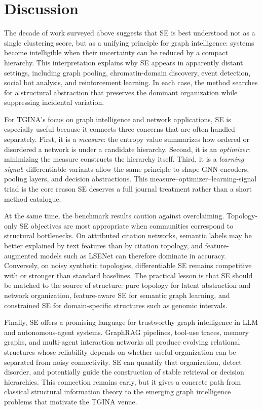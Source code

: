\section{Discussion}
\label{sec:discussion}

The decade of work surveyed above suggests that SE is best understood not as a
single clustering score, but as a unifying principle for graph intelligence:
systems become intelligible when their uncertainty can be reduced by a
compact hierarchy.
This interpretation explains why SE appears in apparently distant settings,
including graph pooling, chromatin-domain discovery, event detection, social
bot analysis, and reinforcement learning.
In each case, the method searches for a structural abstraction that preserves
the dominant organization while suppressing incidental variation.

For TGINA's focus on graph intelligence and network applications, SE is
especially useful because it connects three concerns that are often handled
separately.
First, it is a \emph{measure}: the entropy value summarizes how ordered or
disordered a network is under a candidate hierarchy.
Second, it is an \emph{optimizer}: minimizing the measure constructs the
hierarchy itself.
Third, it is a \emph{learning signal}: differentiable variants allow the same
principle to shape GNN encoders, pooling layers, and decision abstractions.
This measure--optimizer--learning-signal triad is the core reason SE deserves
a full journal treatment rather than a short method catalogue.

At the same time, the benchmark results caution against overclaiming.
Topology-only SE objectives are most appropriate when communities correspond
to structural bottlenecks.
On attributed citation networks, semantic labels may be better explained by
text features than by citation topology, and feature-augmented models such as
LSENet can therefore dominate in accuracy.
Conversely, on noisy synthetic topologies, differentiable SE remains
competitive with or stronger than standard baselines.
The practical lesson is that SE should be matched to the source of structure:
pure topology for latent abstraction and network organization, feature-aware
SE for semantic graph learning, and constrained SE for domain-specific
structures such as genomic intervals.

Finally, SE offers a promising language for trustworthy graph intelligence in
LLM and autonomous-agent systems.
GraphRAG pipelines, tool-use traces, memory graphs, and multi-agent interaction
networks all produce evolving relational structures whose reliability depends
on whether useful organization can be separated from noisy connectivity.
SE can quantify that organization, detect disorder, and potentially guide the
construction of stable retrieval or decision hierarchies.
This connection remains early, but it gives a concrete path from classical
structural information theory to the emerging graph intelligence problems
that motivate the TGINA venue.
